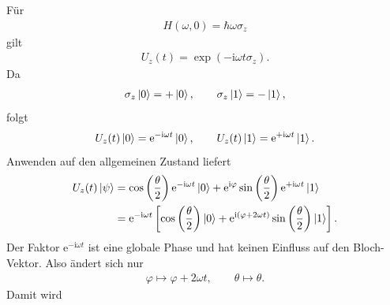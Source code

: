 \documentclass[11pt,a4paper]{scrartcl}
\newcommand{\e}{\mathrm e}
\newcommand{\ii}{\mathrm i}
\begin{document}
\begin{enumerate}[label=(\alph*)]
\begin{calculationbox}
            \begin{calculationbox}[title=Zeitentwicklung um die $z$-Achse]
                Für
                \begin{align*}
                    H(\omega,0)=\hbar\omega\sigma_z
                \end{align*}
                gilt
                \begin{align*}
                    U_z(t)
                    =
                    \exp(-\ii\omega t\sigma_z).
                \end{align*}
                Da
                \begin{align*}
                    \sigma_z\ket{0}=+\ket{0},
                    \qquad
                    \sigma_z\ket{1}=-\ket{1},
                \end{align*}
                folgt
                \begin{align*}
                    U_z(t)\ket{0}
                    =
                    \e^{-\ii\omega t}\ket{0},
                    \qquad
                    U_z(t)\ket{1}
                    =
                    \e^{+\ii\omega t}\ket{1}.
                \end{align*}
                Anwenden auf den allgemeinen Zustand liefert
                \begin{align*}
                    U_z(t)\ket{\psi}
                    &=
                    \cos\left(\frac{\theta}{2}\right)
                    \e^{-\ii\omega t}\ket{0}
                    +
                    \e^{\ii\varphi}
                    \sin\left(\frac{\theta}{2}\right)
                    \e^{+\ii\omega t}\ket{1}\\
                    &=
                    \e^{-\ii\omega t}
                    \left[
                        \cos\left(\frac{\theta}{2}\right)\ket{0}
                        +
                        \e^{\ii(\varphi+2\omega t)}
                        \sin\left(\frac{\theta}{2}\right)\ket{1}
                    \right].
                \end{align*}
                Der Faktor $\e^{-\ii\omega t}$ ist eine globale Phase und hat keinen Einfluss auf den Bloch-Vektor. Also ändert sich nur
                \begin{align*}
                    \varphi\mapsto \varphi+2\omega t,
                    \qquad
                    \theta\mapsto\theta.
                \end{align*}
                Damit wird
                \begin{align*}

\end{align*}
\end{calculationbox}
\end{calculationbox}
\end{enumerate}
\end{document}
